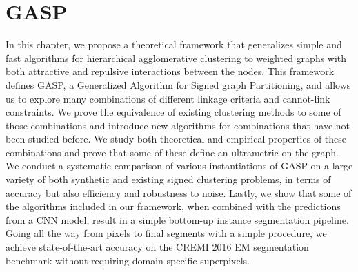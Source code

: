 
\chapter{GASP}\label{chapter:GASP}

In this chapter, we propose a theoretical framework that generalizes simple and fast algorithms for hierarchical agglomerative clustering to weighted graphs with both attractive and repulsive interactions between the nodes. This framework defines GASP, a Generalized Algorithm for Signed graph Partitioning, and allows us to explore many combinations of different linkage criteria and cannot-link constraints. 
We prove the equivalence of existing clustering methods to some of those combinations and introduce new algorithms for combinations that have not been studied before. 
We study both theoretical and empirical properties of these combinations and prove that some of these define an ultrametric on the graph.
We conduct a systematic comparison of various instantiations of GASP on a large variety of both synthetic and existing signed clustering problems, in terms of accuracy but also efficiency and robustness to noise. 
Lastly, we show that some of the algorithms included in our framework, when combined with the predictions from a CNN model, result in a simple bottom-up instance segmentation pipeline.
Going all the way from pixels to final segments with a simple procedure, we achieve state-of-the-art accuracy on the CREMI 2016 EM segmentation benchmark without requiring domain-specific superpixels.


